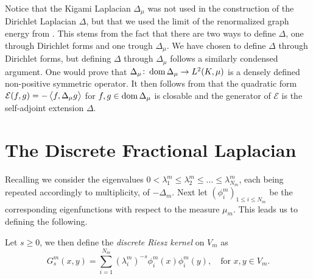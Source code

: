 Notice that the Kigami Laplacian $\Delta_{\mu}$ was not used in the construction of the Dirichlet Laplacian $\Delta$, but that we used the limit of the renormalized graph energy from . This stems from the fact that there are two ways to define $\Delta$, one through Dirichlet forms and one trough $\Delta_{\mu}$. We have chosen to define $\Delta$ through Dirichlet forms, but defining $\Delta$ through $\Delta_{\mu}$ follows a similarly condensed argument. One would prove that $\Delta_{\mu}\colon \operatorname{dom} \Delta_\mu \to L^{2}(K, \mu)$ is a densely defined non-positive symmetric operator. It then follows from \cite[Lemma 1.3.5]{fabriceDirichelt} that the quadratic form $\mathcal{E}(f,g) = -\left\langle f, \Delta_{\mu} g \right\rangle$ for $f,g \in \operatorname{dom} \Delta_{\mu}$ is closable and the generator of $\mathcal{E}$ is the self-adjoint extension $\Delta$.

\medskip
\section{The Discrete Fractional Laplacian}
Recalling  we consider the eigenvalues $0 < \lambda_1^{m} \leq \lambda_{2}^{m} \leq \ldots \leq \lambda_{N_m}^{m}$, each being repeated accordingly to multiplicity, of $-\Delta_m$. Next let $(\phi_i^{m})_{1 \leq i \leq N_m}$ be the corresponding eigenfunctions with respect to the measure $\mu_m$. This leads us to defining the following.

\medskip
\begin{defi}
	Let $s \geq 0$, we then define the \emph{discrete Riesz kernel} on $V_m$ as
	\begin{equation}
		G_s^{m}(x,y) = \sum_{i = 1}^{N_m} (\lambda_i^{m})^{-s} \phi_{i}^{m}(x)\phi_{i}^{m}(y), \quad \text{for }x, y \in V_m.
	\end{equation}
\end{defi}

